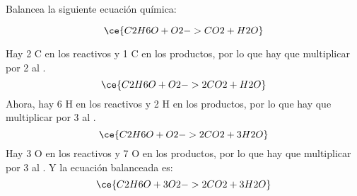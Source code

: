 Balancea la siguiente ecuación química:

\[
    \ce{C2H6O + O2 -> CO2 + H2O}
\]

\begin{solutionbox}{8cm}
    Hay 2 C  en los reactivos y 1 C  en los productos, por lo que hay que multiplicar por 2 al .
    \[
        \ce{C2H6O + O2 -> 2CO2 + H2O}
    \]
    Ahora, hay 6 H en los reactivos y 2 H en los productos, por lo que hay que multiplicar por 3 al .
    \[
        \ce{C2H6O + O2 -> 2CO2 + 3H2O}
    \]
    Hay 3 O en los reactivos y 7 O en los productos, por lo que hay que multiplicar por 3 al . Y la ecuación balanceada es:
    \[
        \ce{C2H6O + 3O2 -> 2CO2 + 3H2O}
    \]
\end{solutionbox}